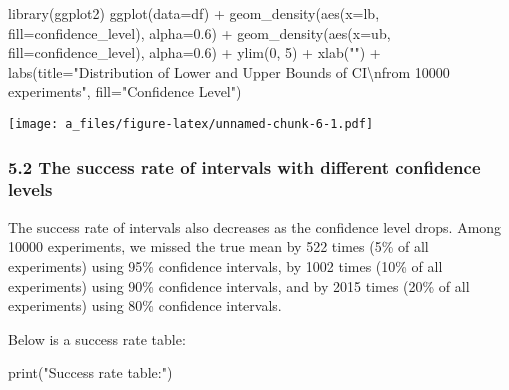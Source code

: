 \documentclass[
]{article}
\newenvironment{Shaded}{\begin{snugshade}}{\end{snugshade}}
\newcommand{\AttributeTok}[1]{\textcolor[rgb]{0.77,0.63,0.00}{#1}}
\newcommand{\DecValTok}[1]{\textcolor[rgb]{0.00,0.00,0.81}{#1}}
\newcommand{\FloatTok}[1]{\textcolor[rgb]{0.00,0.00,0.81}{#1}}
\newcommand{\FunctionTok}[1]{\textcolor[rgb]{0.00,0.00,0.00}{#1}}
\newcommand{\NormalTok}[1]{#1}
\newcommand{\SpecialCharTok}[1]{\textcolor[rgb]{0.00,0.00,0.00}{#1}}
\newcommand{\StringTok}[1]{\textcolor[rgb]{0.31,0.60,0.02}{#1}}
\begin{document}
\begin{Shaded}
\begin{Highlighting}[]
\FunctionTok{library}\NormalTok{(ggplot2)}
\FunctionTok{ggplot}\NormalTok{(}\AttributeTok{data=}\NormalTok{df) }\SpecialCharTok{+}
  \FunctionTok{geom\_density}\NormalTok{(}\FunctionTok{aes}\NormalTok{(}\AttributeTok{x=}\NormalTok{lb, }\AttributeTok{fill=}\NormalTok{confidence\_level), }\AttributeTok{alpha=}\FloatTok{0.6}\NormalTok{) }\SpecialCharTok{+}
  \FunctionTok{geom\_density}\NormalTok{(}\FunctionTok{aes}\NormalTok{(}\AttributeTok{x=}\NormalTok{ub, }\AttributeTok{fill=}\NormalTok{confidence\_level), }\AttributeTok{alpha=}\FloatTok{0.6}\NormalTok{) }\SpecialCharTok{+}
  \FunctionTok{ylim}\NormalTok{(}\DecValTok{0}\NormalTok{, }\DecValTok{5}\NormalTok{) }\SpecialCharTok{+}
  \FunctionTok{xlab}\NormalTok{(}\StringTok{""}\NormalTok{) }\SpecialCharTok{+}
  \FunctionTok{labs}\NormalTok{(}\AttributeTok{title=}\StringTok{"Distribution of Lower and Upper Bounds of CI}\SpecialCharTok{\textbackslash{}n}\StringTok{from 10000 experiments"}\NormalTok{,}
       \AttributeTok{fill=}\StringTok{"Confidence Level"}\NormalTok{)}
\end{Highlighting}
\end{Shaded}

\texttt{[image: a\_files/figure-latex/unnamed-chunk-6-1.pdf]}

\hypertarget{the-success-rate-of-intervals-with-different-confidence-levels}{%
\subsubsection{5.2 The success rate of intervals with different
confidence
levels}\label{the-success-rate-of-intervals-with-different-confidence-levels}}

The success rate of intervals also decreases as the confidence level
drops. Among 10000 experiments, we missed the true mean by 522 times
(5\% of all experiments) using 95\% confidence intervals, by 1002 times
(10\% of all experiments) using 90\% confidence intervals, and by 2015
times (20\% of all experiments) using 80\% confidence intervals.

Below is a success rate table:

\begin{Shaded}
\begin{Highlighting}[]
\FunctionTok{print}\NormalTok{(}\StringTok{"Success rate table:"}\NormalTok{)}
\end{Highlighting}
\end{Shaded}
\end{document}
